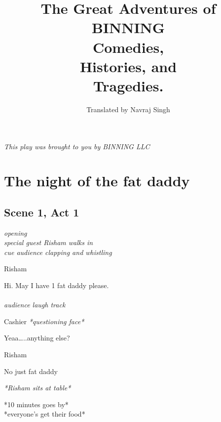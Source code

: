\documentclass[12pt]{article}
\begin{document}
\title{The Great Adventures of
\\{\Huge {\textbf{BINNING}}}
\\
\bigskip
\small{Comedies, \\Histories, and \\Tragedies.}}
\author{Translated by Navraj Singh}
\maketitle 

\bigskip
\begin{tiny}
    \begin{center}
        \textit{This play was brought to you by BINNING LLC}
    \end{center}
\end{tiny}

\section*{The night of the fat daddy}
\subsection*{Scene 1, Act 1}
\begin{center}
    \textit{opening\\special guest Risham walks in\\cue audience clapping and whistling}
\end{center}

Risham
\begin{center}
    Hi. May I have 1 fat daddy please.\\
    \textit{\\audience laugh track}
\end{center}

Cashier 
\textit{*questioning face*} 
\begin{center}
    Yeaa…..anything else?
\end{center}

Risham
\begin{center}
    No just fat daddy
\end{center}
\begin{flushright}
    \textit{*Risham sits at table*}
\end{flushright}

\begin{center}
    *10 minutes goes by*\\*everyone’s get their food*
\end{center}
\end{document}
